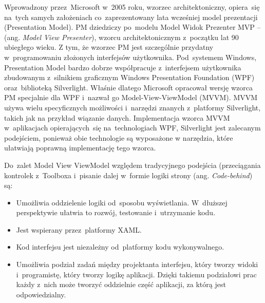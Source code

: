 \documentclass[a4paper,twoside,titlepage,openright]{book}
\begin{document}
Wprowadzony przez~Microsoft w~2005 roku, wzorzec architektoniczny, opiera~się na~tych samych założeniach co~zaprezentowany lata wcześniej model prezentacji (Presentation Model). PM dziedziczy po~modelu Model Widok Prezenter MVP -- (ang. \textit{Model View Presenter}), wzorcu architektonicznym z~początku lat 90 ubiegłego wieku. Z tym, że wzorzec PM jest szczególnie przydatny w~programowaniu złożonych interfejsów użytkownika. Pod~systemem Windows, Presentation Model bardzo dobrze współpracuje z~interfejsem użytkownika zbudowanym z~silnikiem graficznym Windows Presentation Foundation (WPF) oraz~biblioteką Silverlight. Właśnie dlatego Microsoft opracował wersję wzorca PM specjalnie dla WPF i~nazwał go Model-View-ViewModel (MVVM).\cite{aspNet} MVVM używa wielu specyficznych możliwości i~narzędzi znanych z~platformy Silverlight, takich jak na przykład wiązanie danych. Implementacja wzorca MVVM w~aplikacjach opierających~się na~technologiach WPF, Silverlight jest zalecanym podejściem, ponieważ obie technologie są wyposażone w narzędzia, które ułatwiają poprawną implementację tego wzorca.

Do~zalet Model View ViewModel względem tradycyjnego podejścia (przeciągania kontrolek z~Toolboxa i~pisanie dalej w~formie logiki strony (ang. \textit{Code-behind}) są:

\begin{itemize}

	\item Umożliwia oddzielenie logiki od~sposobu wyświetlania. W~dłuższej perspektywie ułatwia to rozwój, testowanie i~utrzymanie kodu.
	\item Jest wspierany przez~platformy XAML.
	\item Kod interfejsu jest niezależny od~platformy kodu wykonywalnego.
	\item Umożliwia podział zadań między projektanta interfejsu, który tworzy widoki i~programistę, który tworzy logikę aplikacji. Dzięki takiemu podziałowi prac każdy z~nich może tworzyć oddzielnie część aplikacji, za którą jest odpowiedzialny.
\end{itemize}
\end{document}
